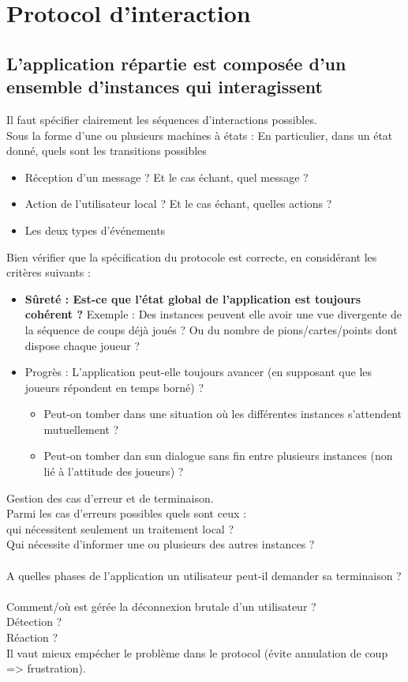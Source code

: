 \documentclass{article}
\begin{document}
\section{Protocol d'interaction}
\subsection{L'application répartie est composée d'un ensemble d'instances qui interagissent}
Il faut spécifier clairement les séquences d'interactions possibles.\\
Sous la forme d'une ou plusieurs machines à états :
En particulier, dans un état donné, quels sont les transitions possibles
\begin{itemize}
\item Réception d'un message ? Et le cas échant, quel message ?
\item Action de l'utilisateur local ? Et le cas échant, quelles actions ?
\item Les deux types d'événements
\end{itemize}
Bien vérifier que la spécification du protocole est correcte, en considérant les critères suivants :
\begin{itemize}
  \item \textbf{Sûreté : Est-ce que l'état global de l'application est toujours cohérent ?}
    Exemple : Des instances peuvent elle avoir une vue divergente de la séquence de coups déjà joués ? Ou du nombre de pions/cartes/points dont dispose chaque joueur ?
  \item Progrès : L'application peut-elle toujours avancer (en supposant que les joueurs répondent en temps borné) ?
    \begin{itemize}
      \item Peut-on tomber dans une situation où les différentes instances s'attendent mutuellement ?
      \item Peut-on tomber dan sun dialogue sans fin entre plusieurs instances (non lié à l'attitude des joueurs) ?
    \end{itemize}
\end{itemize}

Gestion des cas d'erreur et de terminaison.\\
Parmi les cas d'erreurs possibles quels sont ceux :\\
qui nécessitent seulement un traitement local ?\\
Qui nécessite d'informer une ou plusieurs des autres instances ?
\\
\\
A quelles phases de l'application un utilisateur peut-il demander sa terminaison ?\\
\\
Comment/où est gérée la déconnexion brutale d'un utilisateur ?\\
Détection ?\\
Réaction ?\\
Il vaut mieux empécher le problème dans le protocol (évite annulation de coup => frustration).\\\\
\end{document}
